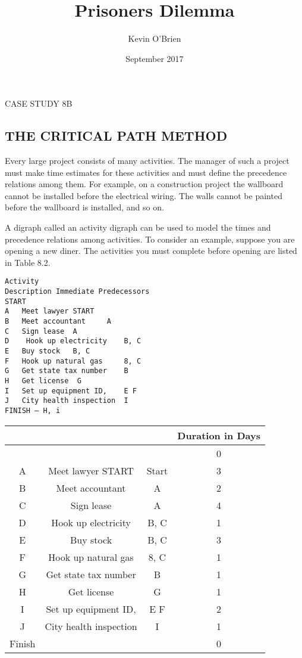 \documentclass{article}
\title{Prisoners Dilemma}
\author{Kevin O'Brien}
\date{September 2017}
\begin{document}




CASE STUDY 8B 
\subsection{THE CRITICAL PATH METHOD}
Every large project consists of many activities. 
The manager of such a project must make time estimates for these activities and must define the precedence relations among them.
For example, on a construction project the wallboard cannot be installed before the electrical wiring. The walls cannot be painted before the wallboard is installed, and so on. 

A digraph called an activity digraph can be used to model the times and precedence relations among activities. To consider an example, suppose you are opening 
a new diner. The activities you must complete before opening are listed in Table 8.2. 
\begin{verbatim}
Activity 
Description Immediate Predecessors 
START 
A 	Meet lawyer START 
B 	Meet accountant 	A 
C 	Sign lease 	A 
D	 Hook up electricity 	B, C 
E 	Buy stock 	B, C 
F 	Hook up natural gas 	8, C 
G 	Get state tax number 	B 
H 	Get license	 G 
I 	Set up equipment ID, 	E F 
J 	City health inspection 	I 
FINISH — H, i 
\end{verbatim}

\begin{tabular}{cccc}
	&		&		&	Duration 	in Days 	\\ \hline
	&		&		&	0		\\ \hline
A 	&	Meet lawyer START 	&	Start	&	3		\\ \hline
B 	&	Meet accountant 	&	A 	&	2		\\ \hline
C 	&	Sign lease 	&	A 	&	4		\\ \hline
D	&	 Hook up electricity 	&	B, C 	&	1		\\ \hline
E 	&	Buy stock 	&	B, C 	&	3		\\ \hline
F 	&	Hook up natural gas 	&	8, C 	&	1		\\ \hline
G 	&	Get state tax number 	&	B 	&	1		\\ \hline
H 	&	Get license	&	 G 	&	1		\\ \hline
I 	&	Set up equipment ID, 	&	E F 	&	2		\\ \hline
J 	&	City health inspection 	&	I 	&	1		\\ \hline
Finish	&		&		&	0		\\ \hline
\end{tabular}
\end{document}
